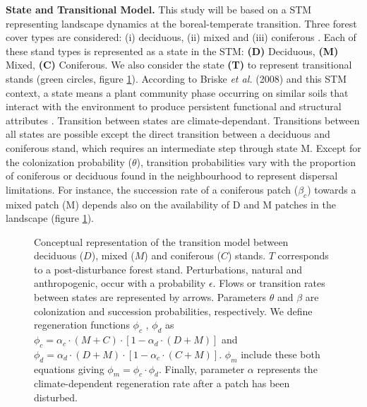 \textbf{State and Transitional Model.} This study will be based on a STM
representing landscape dynamics at the boreal-temperate transition. Three
forest cover types are considered: (i) deciduous, (ii) mixed and (iii)
coniferous \cite{Fisichelli2013}.  Each of these stand types is represented as
a state in the STM: \textbf{(D)} Deciduous, \textbf{(M)} Mixed, \textbf{(C)}
Coniferous. We also consider the state \textbf{(T)} to represent transitional
stands (green circles, figure \ref{Model}).  According to Briske\textit{ et
al.} (2008) and this STM context, a state means a plant community phase
occurring on similar soils that interact with the environment to produce
persistent functional and structural attributes \cite{Briske2008}. Transition
between states are climate-dependant. Transitions between all states are
possible except the direct transition between a deciduous and coniferous
stand, which requires an intermediate step through state M. Except for the
colonization probability ($\theta$), transition probabilities vary with the
proportion of coniferous or deciduous found in the  neighbourhood to represent
dispersal limitations. For instance, the succession rate of a coniferous patch
($\beta_c$) towards a mixed patch (M) depends also on the availability of D
and M patches in the landscape (figure \ref{Model}).  \\

\begin{figure}
	
	\caption{Conceptual representation of the transition model between deciduous ($D$),
	mixed ($M$) and coniferous ($C$) stands. $T$ corresponds to a post-disturbance forest stand. Perturbations, natural and anthropogenic, occur with a probability $\epsilon$. 
	Flows or transition rates between states are represented by arrows.
	Parameters $\theta$ and $\beta$ are  colonization and succession probabilities,
	respectively. We define regeneration functions $\phi_c$ , $\phi_d$ as $\phi_c
	= \alpha_c \cdot (M+C) \cdot [1- \alpha_d \cdot (D+M)]$ and $\phi_d =
	\alpha_d \cdot (D+M) \cdot [1- \alpha_c \cdot (C+M)]$. $\phi_m$ include these both equations giving $\phi_m = \phi_c \cdot \phi_d$. Finally, parameter $\alpha$ represents the climate-dependent regeneration rate after a patch has been disturbed.}
	\label{Model}
	\vspace{1em}
\end{figure}

